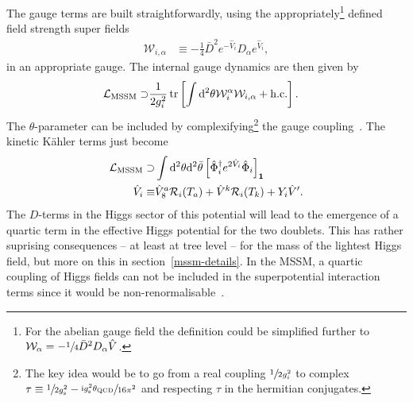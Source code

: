 \noindent The gauge terms are built straightforwardly, using the appropriately\footnote{For the abelian gauge field the definition could be simplified further to \mbox{$\mathcal{W}_\alpha=-\sfrac14\bar{D}^2D_\alpha\hat{V}$}.} defined field strength super fields
\begin{align}
\mathcal{W}_{i, \alpha}&\equiv-\frac14\bar{D}^2e^{-\hat{V}_i}D_\alpha e^{\hat{V}_i},
\end{align}
in an appropriate gauge.
The internal gauge dynamics are then given by
\begin{align}
  \mathcal{L}_\mathrm{MSSM}\supset&\frac1{2g_i^2}\tr\left[\int\dd^2\theta\mathcal{W}_i^\alpha\mathcal{W}_{i, \alpha}+\mathrm{h. c.}\right].
\end{align}
The $\theta$-parameter can be included by complexifying\footnote{The key idea would be to go from a real coupling $\sfrac1{2g_i^2}$ to complex \mbox{$\tau\equiv\sfrac{1}{2g_\mathrm{s}^2}-\sfrac{\mathrm{i} g_\mathrm{s}^2\theta_\mathrm{QCD}}{16\pi^2}$} and respecting $\tau$ in the hermitian conjugates.} the gauge coupling~\cite{lykken, primer, abc}.
The kinetic Kähler terms just become
\begin{align}
  \mathcal{L}_\mathrm{MSSM}\supset&\int\dd^2\theta\dd^2\bar{\theta}\left[\hat{\Phi}^\dagger_ie^{2\hat{V}_i}\hat{\Phi}_i\right]_{\mathbf{1}}\\
  \hat{V}_i\equiv&\hat{V}_8^a\mathcal{R}_i(T_a)+\hat{V}^k\mathcal{R}_i(T_k)+Y_i\hat{V}'.
\end{align}
The $D$-terms in the Higgs sector of this potential will lead to the emergence of a quartic term in the effective Higgs potential for the two doublets. This has rather suprising consequences – at least at tree level – for the mass of the lightest Higgs field, but more on this in section~\ref{mssm-details}.
In the MSSM, a quartic coupling of Higgs fields can not be included in the superpotential interaction terms since it would be non-renormalisable~\cite{higgs, haber, pdg}.

